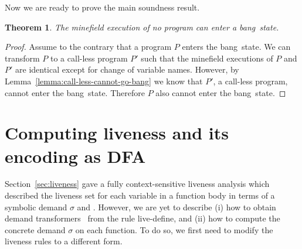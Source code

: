 \documentclass[9pt,preprint,letter,nonatbib]{sigplanconf}
\newcommand{\bang}{\mbox{\sc bang}}
\newtheorem{theorem}{Theorem}[section]
\begin{document}
Now we are ready to prove the main soundness result.

\begin{theorem}
The  minefield  execution of  no  program  can enter  a
\bang\ state.
\end{theorem}
 
\begin{proof}
Assume to  the contrary that  a program $P$  enters the
\bang\  state.  We can  transform  $P$  to a  call-less
program $P'$ such that  the minefield executions of $P$
and $P'$  are identical  except for change  of variable
names.             However,                 by
Lemma~\ref{lemma:call-less-cannot-go-bang} we know that
$P'$,   a   call-less   program,   cannot   enter   the
\bang\  state.  Therefore   $P$  also  cannot  enter  the
\bang\ state.
\end{proof}
 




\section{Computing liveness and its encoding as DFA}\label{sec:computing}
Section~\ref{sec:liveness}  gave   a  fully context-sensitive
liveness analysis which 
described the  liveness set for  each variable  in a function  body in
terms of  a symbolic demand  $\sigma$ and \Lfonly.  However,  we are yet
to describe  (i) how to obtain demand  transformers \Lfonly\ from
the  rule {\sc  live-define}, and  (ii)  how to  compute the  concrete
demand $\sigma$  on each function.   To do so,  we first need to  modify the
liveness rules to a different form.

\end{document}
